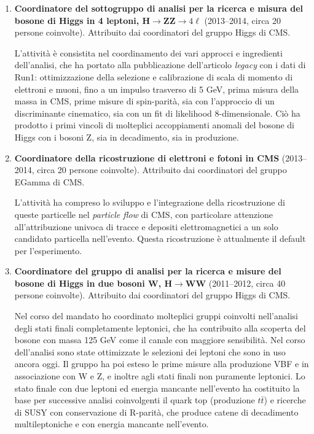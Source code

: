 \documentclass[11pt,twoside,a4paper]{article}
\begin{document}
\begin{enumerate}
\item \textbf{Coordinatore del sottogruppo di analisi per la ricerca e
  misura del bosone di Higgs in 4 leptoni, H$\to$ZZ$\to4\ell$}
  (2013--2014, circa 20 persone coinvolte). Attribuito dai
  coordinatori del gruppo Higgs di CMS.

  L'attivit\`a \`e consistita nel coordinamento dei vari approcci e
  ingredienti dell'analisi, che ha portato alla pubblicazione
  dell'articolo \textit{legacy} con i dati di Run1: ottimizzazione
  della selezione e calibrazione di scala di momento di elettroni e
  muoni, fino a un impulso trasverso di 5 GeV, prima misura della
  massa in CMS, prime misure di spin-parit\`a, sia con l'approccio di
  un discriminante cinematico, sia con un fit di likelihood
  8-dimensionale. Ci\`o ha prodotto i primi vincoli di molteplici
  accoppiamenti anomali del bosone di Higgs con i bosoni Z, sia in
  decadimento, sia in produzione.

\item \textbf{Coordinatore della ricostruzione di elettroni e fotoni in CMS}
  (2013--2014, circa 20 persone coinvolte). Attribuito dai
  coordinatori del gruppo EGamma di CMS.
  
  L'attivit\`a ha compreso lo sviluppo e l'integrazione della
  ricostruzione di queste particelle nel \textit{particle flow} di
  CMS, con particolare attenzione all'attribuzione univoca di tracce e
  depositi elettromagnetici a un solo candidato particella
  nell'evento. Questa ricostruzione \`e attualmente il default per
  l'esperimento.
  
\item \textbf{Coordinatore del gruppo di analisi per la ricerca e
  misure del bosone di Higgs in due bosoni W, H$\to$WW} (2011--2012,
  circa 40 persone coinvolte). Attribuito dai coordinatori del gruppo
  Higgs di CMS.
  
  Nel corso del mandato ho coordinato molteplici gruppi coinvolti
  nell'analisi degli stati finali completamente leptonici, che ha
  contribuito alla scoperta del bosone con massa 125 GeV come il
  canale con maggiore sensibilit\`a. Nel corso dell'analisi sono
  state ottimizzate le selezioni dei leptoni che sono in uso ancora
  oggi. Il gruppo ha poi esteso le prime misure alla produzione VBF
  e in associazione con W e Z, e inoltre agli stati finali non
  puramente leptonici. Lo stato finale con due leptoni ed energia
  mancante nell'evento ha costituito la base per successive analisi
  coinvolgenti il quark top (produzione $t\bar t$) e ricerche di
  SUSY con conservazione di R-parit\`a, che produce catene di
  decadimento multileptoniche e con energia mancante nell'evento.


\end{enumerate}
\end{document}
